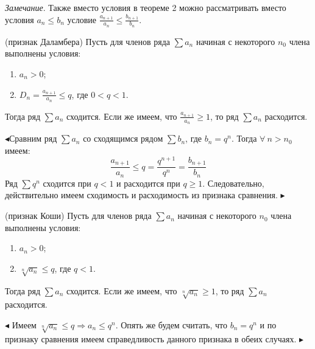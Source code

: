 \textit{Замечание}. Также вместо условия в теореме 2 можно рассматривать вместо условия $a_n\le{b_n}$ условие $\frac{a_{n+1}}{a_n} \le \frac{b_{n+1}}{b_n}$.


\begin{theorem}(признак Даламбера)
Пусть для членов ряда $\sum{a_n}$ начиная с некоторого $n_0$ члена выполнены условия:
\begin{enumerate}
\item $a_n>0$;
\item $D_n=\frac{a_{n+1}}{a_n}\le{q}$, где $0<q<1$.
\end{enumerate}
Тогда ряд $\sum{a_n}$ сходится. Если же имеем, что $\frac{a_{n+1}}{a_n}\ge1$, то ряд $\sum{a_n}$ расходится.
\end{theorem}
$\blacktriangleleft$Сравним ряд $\sum{a_n}$ со сходящимся рядом $\sum{b_n}$, где $b_n=q^n$. Тогда $\forall\ n>n_0$ имеем:
$$\frac{a_{n+1}}{a_n}\le q=\frac{q^{n+1}}{q^n}=\frac{b_{n+1}}{b_n} $$
Ряд $\sum{q^n}$ сходится при $q<1$ и расходится при $q\ge 1$. Следовательно, действительно имеем сходимость и расходимость из признака сравнения. $\blacktriangleright$


\begin{theorem}(признак Коши)
Пусть для членов ряда $\sum{a_n}$ начиная с некоторого $n_0$ члена выполнены условия:
\begin{enumerate}
\item $a_n>0$;
\item $\sqrt[n]{a_n}\le q$, где $q<1$.
\end{enumerate}
Тогда ряд $\sum{a_n}$ сходится. Если же имеем, что $\sqrt[n]{a_n}\ge1$, то ряд $\sum{a_n}$ расходится.
\end{theorem}
$\blacktriangleleft$
Имеем $\sqrt[n]{a_n}\le q \Rightarrow a_n\le q^n$. Опять же будем считать, что $b_n=q^n$ и по признаку сравнения имеем справедливость данного признака в обеих случаях.
$\blacktriangleright$


